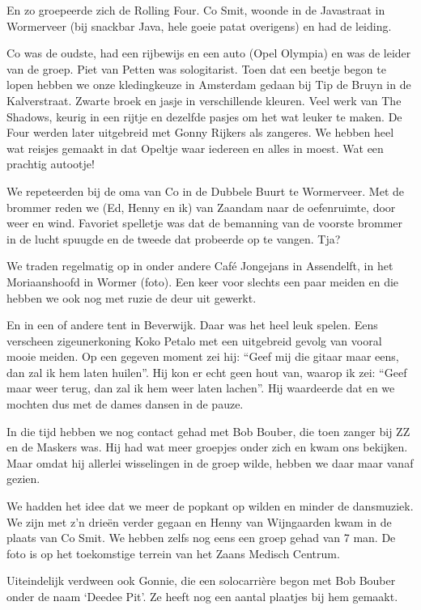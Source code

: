 \documentclass[10pt,twoside,openright]{memoir}
\begin{document}
En zo groepeerde zich de Rolling Four. Co Smit, woonde in de Javastraat in Wormerveer (bij snackbar Java, hele goeie patat overigens) en had de leiding.

Co was de oudste, had een rijbewijs en een auto (Opel Olympia) en was de leider van de groep. Piet van Petten was sologitarist. Toen dat een beetje begon te lopen hebben we onze kledingkeuze in Amsterdam gedaan bij Tip de Bruyn in de Kalverstraat. Zwarte broek en jasje in verschillende kleuren. Veel werk van The Shadows, keurig in een rijtje en dezelfde pasjes om het wat leuker te maken. De Four werden later uitgebreid met Gonny Rijkers als zangeres. We hebben heel wat reisjes gemaakt in dat Opeltje waar iedereen en alles in moest. Wat een prachtig autootje!

We repeteerden bij de oma van Co in de Dubbele Buurt te Wormerveer. Met de brommer reden we (Ed, Henny en ik) van Zaandam naar de oefenruimte, door weer en wind. Favoriet spelletje was dat de bemanning van de voorste brommer in de lucht spuugde en de tweede dat probeerde op te vangen. Tja?

We traden regelmatig op in onder andere Café Jongejans in Assendelft, in het Moriaanshoofd in Wormer (foto). Een keer voor slechts een paar meiden en die hebben we ook nog met ruzie de deur uit gewerkt. 

En in een of andere tent in Beverwijk. Daar was het heel leuk spelen. Eens verscheen zigeunerkoning Koko Petalo met een uitgebreid gevolg van vooral mooie meiden. Op een gegeven moment zei hij: “Geef mij die gitaar maar eens, dan zal ik hem laten huilen”. Hij kon er echt geen hout van, waarop ik zei: “Geef maar weer terug, dan zal ik hem weer laten lachen”. Hij waardeerde dat en we mochten dus met de dames dansen in de pauze.

In die tijd hebben we nog contact gehad met Bob Bouber, die toen zanger bij ZZ en de Maskers was. Hij had wat meer groepjes onder zich en kwam ons bekijken. Maar omdat hij allerlei wisselingen in de groep wilde, hebben we daar maar vanaf gezien. 

We hadden het idee dat we meer de popkant op wilden en minder de dansmuziek. We zijn met z’n drieën verder gegaan en Henny van Wijngaarden kwam in de plaats van Co Smit. We hebben zelfs nog eens een groep gehad van 7 man. De foto is op het toekomstige terrein van het Zaans Medisch Centrum.

Uiteindelijk verdween ook Gonnie, die een solocarrière begon met Bob Bouber onder de naam ‘Deedee Pit’. Ze heeft nog een aantal plaatjes bij hem gemaakt.
\end{document}
